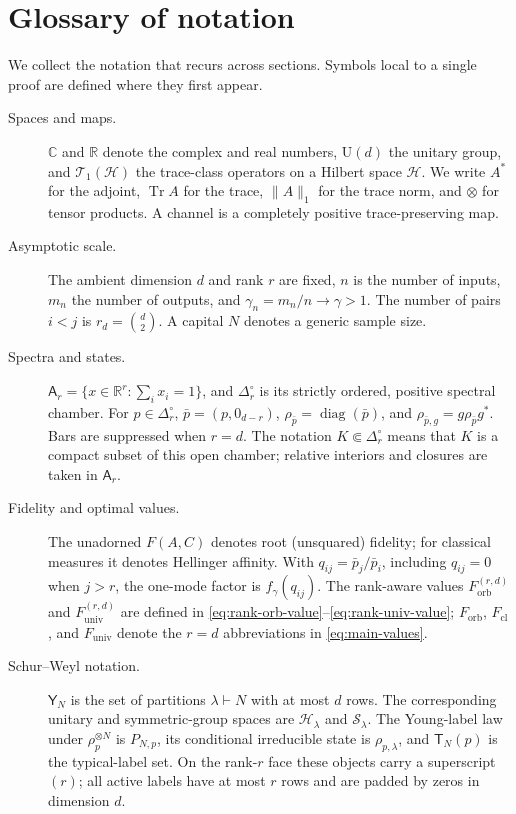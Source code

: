 \documentclass[11pt]{article}
\theoremstyle{remark}
\theoremstyle{plain}
\newcommand{\C}{\mathbb C}
\newcommand{\R}{\mathbb R}
\newcommand{\cH}{\mathcal H}
\newcommand{\cS}{\mathcal S}
\newcommand{\cT}{\mathcal T}
\newcommand{\U}{\mathrm U}
\newcommand{\diag}{\operatorname{diag}}
\newcommand{\Tr}{\operatorname{Tr}}
\newcommand{\ot}{\otimes}
\newcommand{\Forb}{F_{\mathrm{orb}}}
\newcommand{\Fcl}{F_{\mathrm{cl}}}
\newcommand{\Funiv}{F_{\mathrm{univ}}}
\begin{document}
\section*{Glossary of notation}

We collect the notation that recurs across sections.  Symbols local to a
single proof are defined where they first appear.

\begin{description}
\item[Spaces and maps.]
  \(\C\) and \(\R\) denote the complex and real numbers,
  \(\U(d)\) the unitary group, and \(\cT_1(\cH)\) the trace-class
  operators on a Hilbert space \(\cH\).  We write \(A^*\) for the adjoint,
  \(\Tr A\) for the trace, \(\|A\|_1\) for the trace norm, and \(\ot\) for
  tensor products.  A channel is a completely positive trace-preserving map.

\item[Asymptotic scale.]
  The ambient dimension \(d\) and rank \(r\) are fixed, \(n\) is the number of inputs,
  \(m_n\) the number of outputs, and
  \(\gamma_n=m_n/n\to\gamma>1\).  The number of pairs \(i<j\) is
  \(r_d=\binom d2\).  A capital \(N\) denotes a generic sample size.

\item[Spectra and states.]
  \(\mathsf A_r=\{x\in\R^r:\sum_i x_i=1\}\), and
  \(\Delta_r^\circ\) is its strictly ordered, positive spectral chamber.
  For \(p\in\Delta_r^\circ\), \(\bar p=(p,0_{d-r})\),
  \(\rho_{\bar p}=\diag(\bar p)\), and
  \(\rho_{\bar p,g}=g\rho_{\bar p}g^*\).  Bars are suppressed when \(r=d\).
  The notation \(K\Subset\Delta_r^\circ\) means that \(K\) is a compact
  subset of this open chamber; relative interiors and closures are taken in
  \(\mathsf A_r\).

\item[Fidelity and optimal values.]
  The unadorned \(F(A,C)\) denotes root (unsquared) fidelity; for classical
  measures it denotes Hellinger affinity.  With
  \(q_{ij}=\bar p_j/\bar p_i\), including \(q_{ij}=0\) when \(j>r\), the
  one-mode factor is \(f_\gamma(q_{ij})\).  The rank-aware values
  \(\Forb^{(r,d)}\) and \(\Funiv^{(r,d)}\) are defined in
  \eqref{eq:rank-orb-value}--\eqref{eq:rank-univ-value}; \(\Forb\),
  \(\Fcl\), and \(\Funiv\) denote the \(r=d\) abbreviations in
  \eqref{eq:main-values}.

\item[Schur--Weyl notation.]
  \(\mathsf Y_N\) is the set of partitions \(\lambda\vdash N\) with at
  most \(d\) rows.  The corresponding unitary and symmetric-group spaces are
  \(\cH_\lambda\) and \(\cS_\lambda\).  The Young-label law under
  \(\rho_p^{\ot N}\) is \(P_{N,p}\), its conditional irreducible state is
  \(\rho_{p,\lambda}\), and \(\mathsf T_N(p)\) is the typical-label set.
  On the rank-\(r\) face these objects carry a superscript \((r)\); all
  active labels have at most \(r\) rows and are padded by zeros in dimension
  \(d\).


\end{description}
\end{document}
